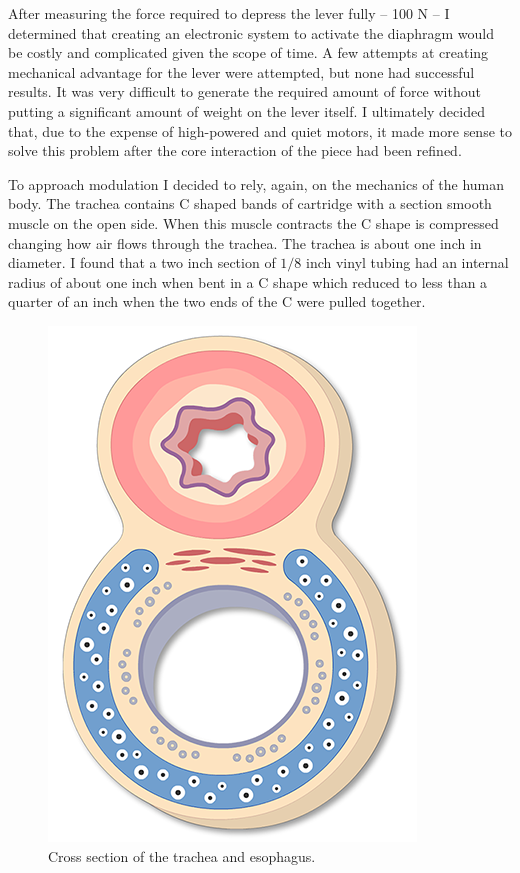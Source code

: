 \documentclass[letterpaper]{article}
\begin{document}
After measuring the force required to depress the lever fully -- 100 N -- I determined that creating an electronic system to activate the diaphragm would be costly and complicated given the scope of time. A few attempts at creating mechanical advantage for the lever were attempted, but none had successful results. It was very difficult to generate the required amount of force without putting a significant amount of weight on the lever itself. I ultimately decided that, due to the expense of high-powered and quiet motors, it made more sense to solve this problem after the core interaction of the piece had been refined. 

To approach modulation I decided to rely, again, on the mechanics of the human body. The trachea contains C shaped bands of cartridge with a section smooth muscle on the open side. When this muscle contracts the C shape is compressed changing how air flows through the trachea. The trachea is about one inch in diameter.\cite{furlow} I found that a two inch section of $1/8$ inch vinyl tubing had an internal radius of about one inch when bent in a C shape which reduced to less than a quarter of an inch when the two ends of the C were pulled together.  

\begin{figure}[h]
\centering
\includegraphics[scale=0.3]{images/trachea.png}
\caption{Cross section of the trachea and esophagus.}
\end{figure}
\end{document}
